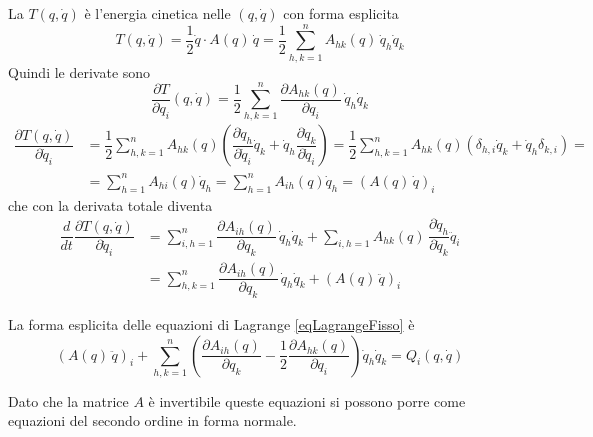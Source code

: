 \documentclass[11pt,a4paper,twoside]{book}
\newenvironment{importante}[0]{ 
  \begin{center}\begin{tcolorbox}[enhanced,
  before skip=2mm,after skip=3mm,
  boxrule=0.4pt,left=5mm,right=2mm,top=1mm,bottom=1mm,
  colback=yellow!50,
  colframe=yellow!20!black,
  sharp corners,arc=3mm,
  underlay={
  	\path[fill=red!50!black,draw=none] (interior.south west) rectangle 			node[white]{\Huge\bfseries !} ([xshift=4mm]interior.north west);
  },
  drop fuzzy shadow]
  }{
 \normalsize \end{tcolorbox}\end{center}
}
\theoremstyle{esss}
\theoremstyle{dotless}
\numberwithin{equation}{section} %
\begin{document}
La $T(q,\dot{q})$ è l'energia cinetica nelle $(q,\dot{q})$ con forma esplicita
\[
T(q,\dot{q})=\dfrac{1}{2} \dot{q} \cdot A(q) \, \dot{q} = \dfrac{1}{2} \sum_{h,k=1}^n A_{hk}(q)\, \dot{q}_h \dot{q}_k
\]
Quindi le derivate sono
\[
\dfrac{\partial T}{\partial q_i}(q,\dot{q}) = \dfrac{1}{2} \sum_{h,k=1}^n \dfrac{\partial A_{hk}(q)}{\partial q_i}\, \dot{q}_h \dot{q}_k
\]
\begin{align*}
\dfrac{\partial T(q,\dot{q})}{\partial \dot{q}_i} &= \dfrac{1}{2} \sum_{h,k=1}^n A_{hk}(q) \left( \dfrac{\partial \dot{q}_h}{\partial \dot{q}_i} \dot{q}_k + \dot{q}_h \dfrac{\partial \dot{q}_k}{\partial \dot{q}_i} \right) 
 = \dfrac{1}{2} \sum_{h,k=1}^n A_{hk}(q) \left( \delta_{h,i} \dot{q}_k + \dot{q}_h \delta_{k,i} \right) = \\
 & =  \sum_{h=1}^n A_{hi}(q) \dot{q}_h =  \sum_{h=1}^n A_{ih}(q) \dot{q}_h  = \left( A(q)\, \dot{q} \right)_i
\end{align*}
che con la derivata totale diventa
\begin{align*}
\dfrac{d}{dt}\dfrac{\partial T(q,\dot{q})}{\partial \dot{q}_i} &= 
\sum_{i,h=1}^n \dfrac{\partial A_{ih}(q)}{\partial q_k} \, \dot{q}_h \dot{q}_k + \sum_{i,h=1} A_{hk}(q) \, \dfrac{\partial \dot{q}_h}{\partial\dot{q}_k} \ddot{q}_i  \\
&= \sum_{h,k=1}^n \dfrac{\partial A_{ih}(q)}{\partial q_k}\, \dot{q}_h \dot{q}_k + \left( A(q)\, \ddot{q} \right)_i
\end{align*}
\begin{importante}
La forma esplicita delle equazioni di Lagrange \ref{eqLagrangeFisso} è
\begin{equation}
\left( A(q)\, \ddot{q} \right)_i +\sum_{h,k=1}^n \left( \dfrac{\partial A_{ih}(q)}{\partial q_k} - \dfrac{1}{2} \dfrac{\partial A_{hk}(q)}{\partial q_i}
\right)\dot{q}_h\dot{q}_k =Q_i(q,\dot{q})
\end{equation}


Dato che la matrice $A$ è invertibile queste equazioni si possono porre come equazioni del secondo ordine in forma normale.
\end{importante}
\end{document}
